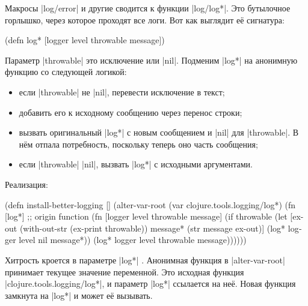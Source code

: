 
Макросы \spverb|log/error| и другие сводится к функции \spverb|log/log*|. Это
бутылочное горлышко, через которое проходят все логи. Вот как выглядит е\"{е}
сигнатура:

\begin{english}
  \begin{clojure}
(defn log* [logger level throwable message])
  \end{clojure}
\end{english}

Параметр \spverb|throwable| это исключение или \spverb|nil|. Подменим
\spverb|log*| на анонимную функцию со следующей логикой:

\begin{itemize}

\item
  если \spverb|throwable| не \spverb|nil|, перевести исключение в текст;

\item
  добавить его к исходному сообщению через перенос строки;

\item
  вызвать оригинальный \spverb|log*| с новым сообщением и \spverb|nil| для
  \spverb|throwable|. В н\"{е}м отпала потребность, поскольку теперь оно часть
  сообщения;

\item
  если \spverb|throwable| \spverb|nil|, вызвать \spverb|log*| с исходными
  аргументами.

\end{itemize}

\noindent
Реализация:


\begin{english}
  \begin{clojure/lines}
(defn install-better-logging []
  (alter-var-root
   (var clojure.tools.logging/log*)
   (fn [log*] ;; origin function
     (fn [logger level throwable message]
       (if throwable
         (let [ex-out (with-out-str (ex-print throwable))
               message* (str message \newline ex-out)]
           (log* logger level nil message*))
         (log* logger level throwable message))))))
  \end{clojure/lines}
\end{english}

Хитрость кроется в параметре \spverb|log*| . Анонимная функция в
\spverb|alter-var-root| принимает текущее значение переменной. Это исходная
функция \spverb|clojure.tools.logging/log*|, и параметр \spverb|log*| ссылается
на не\"{е}. Новая функция замкнута на \spverb|log*| и может е\"{е} вызывать.

